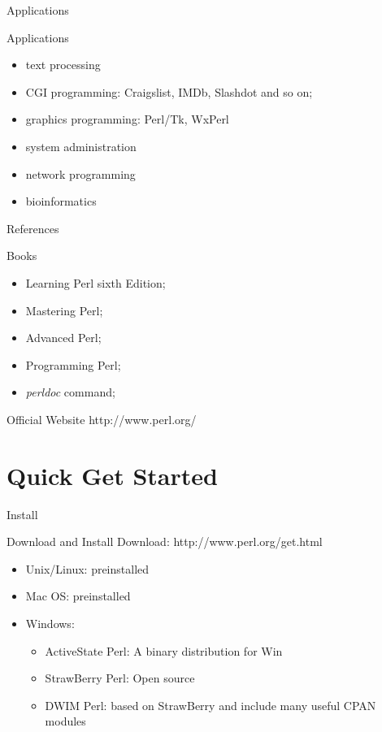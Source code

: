 \documentclass[UTF8]{beamer}
\begin{document}
\begin{frame}[t]{Applications}
\begin{block}{Applications}
  \begin{itemize}
    \item text processing
    \item CGI programming: Craigslist, IMDb, Slashdot and so on;
    \item graphics programming: Perl/Tk, WxPerl
    \item system administration
    \item network programming
    \item bioinformatics
  \end{itemize}
\end{block}
\end{frame}

\begin{frame}[t]{References}
\begin{block}{Books}
  \begin{itemize}
    \item Learning Perl sixth Edition;
    \item Mastering Perl;
    \item Advanced Perl;
    \item Programming Perl;
    \item \textit{perldoc} command;
  \end{itemize}
\end{block}
\begin{block}{Official Website}
  http://www.perl.org/
\end{block}
\end{frame}

\section{Quick Get Started}

\begin{frame}[t]{Install}
\begin{block}{Download and Install}
  Download: http://www.perl.org/get.html
  \begin{itemize}
    \item Unix/Linux: preinstalled
    \item Mac OS: preinstalled
    \item Windows:
    \begin{itemize}
      \item ActiveState Perl: A binary distribution for Win
      \item StrawBerry Perl: Open source
      \item DWIM Perl: based on StrawBerry and include many useful CPAN modules
    \end{itemize}
  \end{itemize}
\end{block}
\end{frame}
\end{document}
